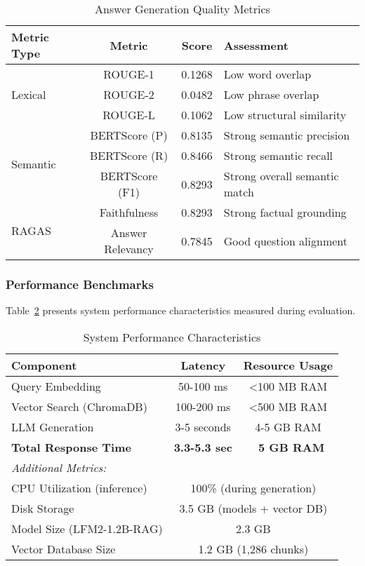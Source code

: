 \begin{table}[htbp]
\centering
\caption{Answer Generation Quality Metrics}
\label{tab:generation_metrics}
\begin{tabular}{lccl}
\toprule
\textbf{Metric Type} & \textbf{Metric} & \textbf{Score} & \textbf{Assessment} \\
\midrule
\multirow{3}{*}{Lexical}
& ROUGE-1 & 0.1268 & Low word overlap \\
& ROUGE-2 & 0.0482 & Low phrase overlap \\
& ROUGE-L & 0.1062 & Low structural similarity \\
\midrule
\multirow{3}{*}{Semantic}
& BERTScore (P) & 0.8135 & Strong semantic precision \\
& BERTScore (R) & 0.8466 & Strong semantic recall \\
& BERTScore (F1) & 0.8293 & Strong overall semantic match \\
\midrule
\multirow{2}{*}{RAGAS}
& Faithfulness & 0.8293 & Strong factual grounding \\
& Answer Relevancy & 0.7845 & Good question alignment \\
\bottomrule
\end{tabular}
\end{table}

\subsubsection{Performance Benchmarks}

Table~\ref{tab:performance} presents system performance characteristics measured during evaluation.

\begin{table}[htbp]
\centering
\caption{System Performance Characteristics}
\label{tab:performance}
\begin{tabular}{lcc}
\toprule
\textbf{Component} & \textbf{Latency} & \textbf{Resource Usage} \\
\midrule
Query Embedding & 50-100 ms & <100 MB RAM \\
Vector Search (ChromaDB) & 100-200 ms & <500 MB RAM \\
LLM Generation & 3-5 seconds & 4-5 GB RAM \\
\midrule
\textbf{Total Response Time} & \textbf{3.3-5.3 sec} & \textbf{~5 GB RAM} \\
\midrule
\multicolumn{3}{l}{\textit{Additional Metrics:}} \\
CPU Utilization (inference) & \multicolumn{2}{c}{100\% (during generation)} \\
Disk Storage & \multicolumn{2}{c}{3.5 GB (models + vector DB)} \\
Model Size (LFM2-1.2B-RAG) & \multicolumn{2}{c}{2.3 GB} \\
Vector Database Size & \multicolumn{2}{c}{1.2 GB (1,286 chunks)} \\
\bottomrule
\end{tabular}
\end{table}

